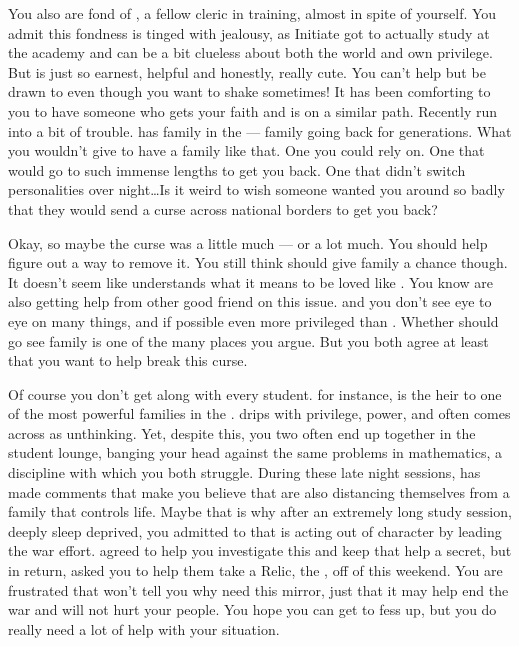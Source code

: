 \documentclass[char]{GL2020}
\begin{document}
You also are fond of \cInitiate{\full}, a fellow cleric in training, almost in spite of yourself. You admit this fondness is tinged with jealousy, as Initiate{} got to actually study at the academy and \cInitiate{\they} can be a bit clueless about both the world and \cInitiate{\their} own privilege. But \cInitiate{} is just so earnest, helpful and honestly, really cute. You can’t help but be drawn to \cInitiate{\them} even though you want to shake \cInitiate{\them} sometimes! It has been comforting to you to have someone who gets your faith and is on a similar path. Recently \cInitiate{\they} \cInitiate{\have} run into a bit of trouble. \cInitiate{} has family in the \pFarm{} — family going back for generations. What you wouldn’t give to have a family like that. One you could rely on. One that would go to such immense lengths to get you back. One that didn’t switch personalities over night\ldots Is it weird to wish someone wanted you around so badly that they would send a curse across national borders to get you back?  

Okay, so maybe the curse was a little much — or a lot much. You should help \cInitiate{} figure out a way to remove it. You still think \cInitiate{\they} should give \cInitiate{\their} family a chance though. It doesn’t seem like \cInitiate{} understands what it means to be loved like \cInitiate{\they} \cInitiate{\are}. You know \cInitiate{\they} are also getting help from \cInitiate{\their} other good friend \cPresident{\full} on this issue. \cPresident{} and you don’t see eye to eye on many things, and if possible \cPresident{\they} \cPresident{\are} even more privileged than \cInitiate{}. Whether \cInitiate{} should go see \cInitiate{\their} family is one of the many places you argue. But you both agree at least that you want to help \cInitiate{} break this curse.

Of course you don’t get along with every student. \cHeir{\full} for instance, is the heir to one of the most powerful families in the \pTech{}. \cHeir{} drips with privilege, power, and often comes across as unthinking. Yet, despite this, you two often end up together in the student lounge, banging your head against the same problems in mathematics, a discipline with which you both struggle. During these late night sessions, \cHeir{} has made comments that make you believe that \cHeir{\they} are also distancing themselves from a family that controls \cHeir{\their} life. Maybe that is why after an extremely long study session, deeply sleep deprived, you admitted to \cHeir{} that \cLoud{} is acting out of character by leading the war effort. \cHeir{} agreed to help you investigate this and keep that help a secret, but in return, \cHeir{\they} asked you to help them take a Relic, the  \iMirror{}, off of \cHeir{\their} \cDiplomat{\auncle} this weekend. You are frustrated that \cHeir{\they} won’t tell you why \cHeir{\they} need this mirror, just that it may help end the war and will not hurt your people. You hope you can get \cHeir{\them} to fess up, but you do really need a lot of help with your situation.
\end{document}
